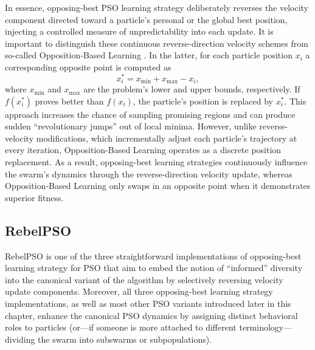 {In essence, opposing‐best PSO learning strategy deliberately reverses the velocity component directed toward a particle's personal or the global best position, injecting a controlled measure of unpredictability into each update.
It is important to distinguish these continuous reverse‐direction velocity schemes from so-called Opposition‐Based Learning \citep[see, e.g.,][]{tizhoosh2005opposition,tizhoosh2006opposition,zhou2020improved}. In the latter, for each particle position $x_i$ a corresponding opposite point is computed as
\begin{equation}
    x_{i}^{*} = x_{\min} + x_{\max} - x_i,
\end{equation}
where $x_{\min}$ and $x_{\max}$ are the problem’s lower and upper bounds, respectively. If $f(x_{i}^{*})$ proves better than $f(x_i)$, the particle’s position is replaced by $x_{i}^{*}$. This approach increases the chance of sampling promising regions and can produce sudden ``revolutionary jumps'' out of local minima. However, unlike reverse-velocity modifications, which incrementally adjust each particle’s trajectory at every iteration, Op\-po\-si\-tion\-\mbox{-Based} Learning operates as a discrete position replacement. As a result, opposing-best learning strategies continuously influence the swarm's dynamics through the reverse\--di\-rec\-tion velocity update, whereas Opposition‐Based Learning only swaps in an opposite point when it demonstrates superior fitness.






\subsection{RebelPSO}

RebelPSO is one of the three straightforward implementations of opposing-best learning strategy for PSO that aim to embed the notion of ``informed'' diversity into the canonical variant of the algorithm by selectively reversing velocity update components.
Moreover, all three opposing-best learning strategy implementations, as well as most other PSO variants introduced  later in this chapter, enhance the canonical PSO dynamics by assigning distinct behavioral roles to particles  (or---if someone is more attached to different terminology---dividing the swarm into subswarms or subpopulations).



}
